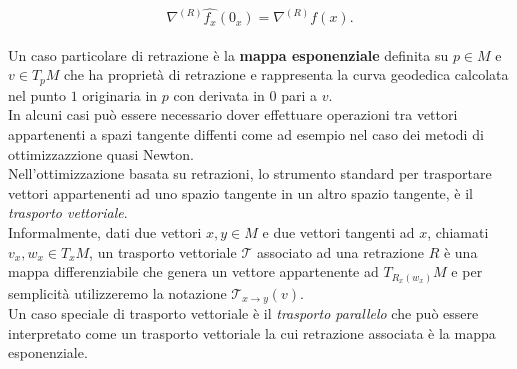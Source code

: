 \documentclass[a4paper, 12pt]{article}
\begin{document}
\[ \nabla^{(R)} \hat{f_x}(0_x) = \nabla^{(R)} f(x).\]\\
Un caso particolare di retrazione è la \textbf{mappa esponenziale} definita su $p \in M$ e $v \in T_pM$ che ha proprietà di retrazione e rappresenta la curva geodedica calcolata nel punto $1$ originaria in $p$ con derivata in $0$ pari a $v$.\\
In alcuni casi può essere necessario dover effettuare operazioni tra vettori appartenenti a spazi tangente diffenti come ad esempio nel caso dei metodi di ottimizzazzione quasi Newton.\\ Nell'ottimizzazione basata su retrazioni, lo strumento standard per trasportare vettori appartenenti ad uno spazio tangente in un altro spazio tangente, è il \textit{trasporto vettoriale}.\\
Informalmente, dati due vettori $x, y \in M$ e due vettori tangenti ad $x$, chiamati $v_x, w_x \in T_xM$, un trasporto vettoriale $\mathcal{T}$ associato ad una retrazione $R$ è una mappa differenziabile che genera un vettore appartenente ad $T_{R_x(w_x)}M$ e per semplicità utilizzeremo la notazione $\mathcal{T}_{x \to y}(v)$.\\
Un caso speciale di trasporto vettoriale è il \textit{trasporto parallelo} che può essere interpretato come un trasporto vettoriale la cui retrazione associata è la mappa esponenziale.
\end{document}
